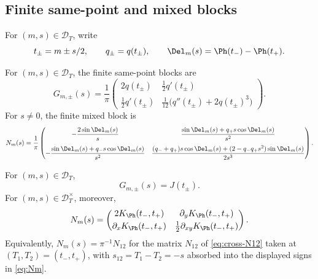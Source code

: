 \subsection{Finite same-point and mixed blocks}
\label{subsec:finite-same-point-and-mixed-blocks}

For \((m,s)\in\mathcal D_T\), write
\[
        t_\pm = m\pm s/2,
        \qquad q_\pm = q(t_\pm),
        \qquad \Del_m(s) = \Ph(t_-)-\Ph(t_+).
\]

\begin{definition}
\label{def:finite-same-point-and-mixed-blocks}
For \((m,s)\in\mathcal D_T\), the finite same-point blocks are
\begin{equation}
\label{eq:Gpm}
G_{m,\pm}(s)
=\frac1\pi
\begin{pmatrix}
2q(t_\pm) & \tfrac12 q'(t_\pm)\\[0.8ex]
\tfrac12 q'(t_\pm) & \tfrac1{12}\bigl(q''(t_\pm)+2q(t_\pm)^3\bigr)
\end{pmatrix}.
\end{equation}
For \(s\ne 0\), the finite mixed block is
\begin{equation}
\label{eq:Nm}
N_m(s)
=\frac1\pi
\begin{pmatrix}
-\dfrac{2\sin\Del_m(s)}{s}
&
\dfrac{\sin\Del_m(s)+q_+ s\cos\Del_m(s)}{s^2}
\\[2.4ex]
-\dfrac{\sin\Del_m(s)+q_- s\cos\Del_m(s)}{s^2}
&
\dfrac{(q_-+q_+)s\cos\Del_m(s)+(2-q_- q_+ s^2)\sin\Del_m(s)}{2s^3}
\end{pmatrix}.
\end{equation}
\end{definition}

\begin{lemma}
\label{lem:finite-blocks-exact-interpretation}
For \((m,s)\in\mathcal D_T\),
\[
        G_{m,\pm}(s) = J(t_\pm).
\]
For \((m,s)\in\mathcal D_T^\times\), moreover,
\begin{equation}
\label{eq:Nm-kernel-derivative-form}
N_m(s)
=
\begin{pmatrix}
2K_\Ph(t_-,t_+) & \partial_y K_\Ph(t_-,t_+)\\[0.6ex]
\partial_x K_\Ph(t_-,t_+) & \tfrac12\partial_{xy}K_\Ph(t_-,t_+)
\end{pmatrix}.
\end{equation}
Equivalently, \(N_m(s) = \pi^{-1} N_{12}\) for the matrix \(N_{12}\) of
\eqref{eq:cross-N12} taken at \((T_1, T_2) = (t_-, t_+)\), with
\(s_{12} = T_1 - T_2 = -s\) absorbed into the displayed signs in
\eqref{eq:Nm}.
\end{lemma}


